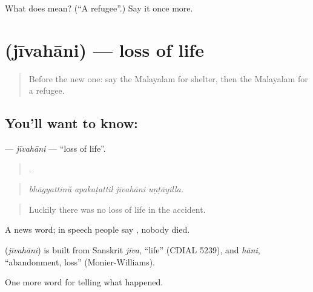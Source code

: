 \begin{tcolorbox}[breakable,colback=teal!4,colframe=teal!35!black,title={Before you move on}]
What does  mean? (\textquotedblleft{}A refugee\textquotedblright{}.) Say it once more.
\end{tcolorbox}
\section[\texorpdfstring{\ml{ജീവഹാനി} (jīvahāni)}{ജീവഹാനി (jīvahāni)}]{ (jīvahāni) — loss of life}

\label{lesson:ML-C378-jivahani}



\begin{quote}
Before the new one: say the Malayalam for shelter, then the Malayalam for a refugee.
\end{quote}

\subsection*{You'll want to know: }
\textbf{} — \emph{jīvahāni} — \textquotedblleft{}loss of life\textquotedblright{}.

\begin{quote}
   .
\end{quote}

\begin{quote}
\emph{bhāgyattinŭ apakaṭattil jīvahāni uṇṭāyilla.}
\end{quote}

\begin{quote}
Luckily there was no loss of life in the accident.
\end{quote}

A news word; in speech people say  , nobody died.

\begin{cousinweb}
\textbf{} (\emph{jīvahāni}) is built from Sanskrit \emph{jīva}, \textquotedblleft{}life\textquotedblright{} (CDIAL 5239), and \emph{hāni}, \textquotedblleft{}abandonment, loss\textquotedblright{} (Monier-Williams).
\end{cousinweb}

\begin{grammarlens}[title={What you've built}]
One more word for telling what happened.
\end{grammarlens}

